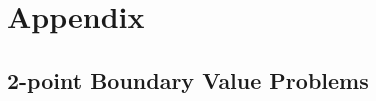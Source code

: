 \documentclass[12pt, a4paper, titlepage]{article} %
\begin{document}
% 

%


\tableofcontents
\newpage





% 

\clearpage
\appendix
\section{Appendix}
\subsection{2-point Boundary Value Problems}
%
\end{document}

